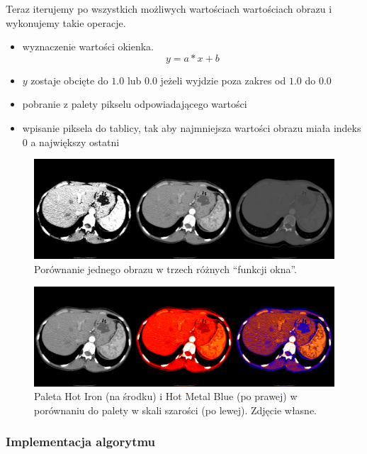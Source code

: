 Teraz iterujemy po wszystkich możliwych wartościach wartościach obrazu i wykonujemy takie operacje.
\begin{itemize}
    \item wyznaczenie wartości okienka.
          \[y = a * x + b\]
    \item $y$ zostaje obcięte do $1.0$ lub $0.0$ jeżeli wyjdzie poza zakres od $1.0$ do $0.0$
    \item pobranie z palety pikselu odpowiadającego wartości
    \item wpisanie piksela do tablicy, tak aby najmniejsza wartości obrazu miała indeks $0$ a największy ostatni
\end{itemize}


\begin{figure}[!htbp]
    \centering
    \includegraphics[width=\textwidth]{img/monochrome-002.png}
    \caption{Porównanie jednego obrazu w trzech różnych \enquote{funkcji okna}.}
    \label{fig:algorithm-pixmap-monochrome-multiwindow}
\end{figure}

\begin{figure}[!htbp]
    \centering
    \includegraphics[width=\textwidth]{img/monochrome-003.png}
    \caption{Paleta Hot Iron (na środku) i Hot Metal Blue (po prawej) w porównaniu do palety w skali szarości (po lewej). Zdjęcie własne.}
    \label{fig:algorithm-pixmap-monochrome-palette}
\end{figure}


\subsubsection{Implementacja algorytmu}

